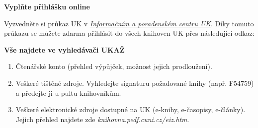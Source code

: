 

\ifdefined\ikonka\else%
\newcommand\ikonka[1]{\bigskip\bgroup\Large #1\egroup\par}
\renewcommand\section[2][]{%
  \bgroup\large \textbf{#2}\egroup\par%
}
\fi
\ikonka{\faPencil}
\section{Vyplňte přihlášku online}

Vyzvedněte si průkaz UK v \href{http://www.cuni.cz/UK-3249.html}{\emph{Informačním a poradenském
centru UK}}. 
Díky tomuto průkazu se můžete zdarma přihlásit do všech knihoven UK přes následující odkaz:


\ikonka{\faSearch}
\section{Vše najdete ve vyhledávači UKAŽ}

\vspace{-1em}
\begin{enumerate}
  \item Čtenářské konto (přehled výpůjček, možnost jejich prodloužení).

  \item Veškeré tištěné zdroje. Vyhledejte signaturu požadované knihy (např. F54759) a předejte ji u pultu knihovníkům.

  \item Veškeré elektronické zdroje dostupné na UK (e-knihy, e-časopisy, e-články).\\ Jejich přehled najdete zde \textit{knihovna.pedf.cuni.cz/eiz.htm}.
\end{enumerate}


